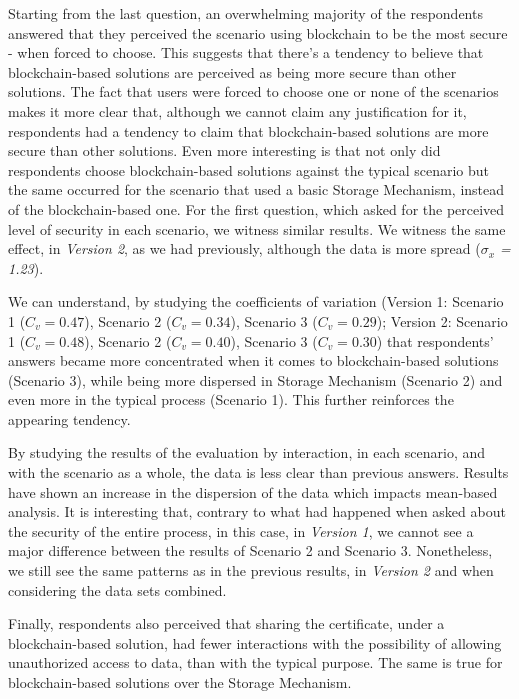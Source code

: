 Starting from the last question, an overwhelming majority of the respondents answered that they perceived the scenario using blockchain to be the most secure - when forced to choose. This suggests that there's a tendency to believe that blockchain-based solutions are perceived as being more secure than other solutions. The fact that users were forced to choose one or none of the scenarios makes it more clear that, although we cannot claim any justification for it, respondents had a tendency to claim that blockchain-based solutions are more secure than other solutions. Even more interesting is that not only did respondents choose blockchain-based solutions against the typical scenario but the same occurred for the scenario that used a basic Storage Mechanism, instead of the blockchain-based one. For the first question, which asked for the perceived level of security in each scenario, we witness similar results. We witness the same effect, in \textit{Version 2}, as we had previously, although the data is more spread (\textit{$\sigma_{x}$ = 1.23}).

We can understand, by studying the coefficients of variation (Version 1: Scenario 1 ($C_v = 0.47$), Scenario 2 ($C_v = 0.34$), Scenario 3 ($C_v = 0.29$); Version 2: Scenario 1 ($C_v = 0.48$), Scenario 2 ($C_v = 0.40$), Scenario 3 ($C_v = 0.30$) that respondents' answers became more concentrated when it comes to blockchain-based solutions (Scenario 3), while being more dispersed in Storage Mechanism (Scenario 2) and even more in the typical process (Scenario 1). This further reinforces the appearing tendency.

By studying the results of the evaluation by interaction, in each scenario, and with the scenario as a whole, the data is less clear than previous answers. Results have shown an increase in the dispersion of the data which impacts mean-based analysis. It is interesting that, contrary to what had happened when asked about the security of the entire process, in this case, in \textit{Version 1}, we cannot see a major difference between the results of Scenario 2 and Scenario 3. Nonetheless, we still see the same patterns as in the previous results, in \textit{Version 2} and when considering the data sets combined.

Finally, respondents also perceived that sharing the certificate, under a blockchain-based solution, had fewer interactions with the possibility of allowing unauthorized access to data, than with the typical purpose. The same is true for blockchain-based solutions over the Storage Mechanism.

